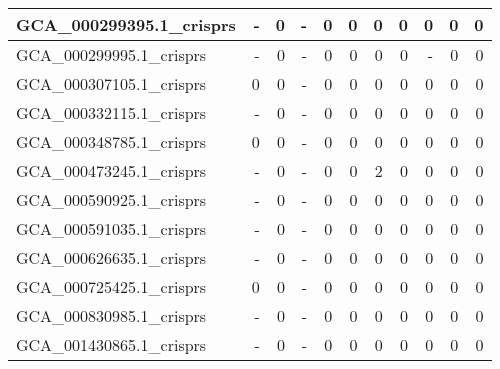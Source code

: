 \documentclass[12pt,a4paper]{article}
\begin{document}
\begin{table}[ht]
\begin{center}
\begin{tabular}{|l*{10}{|r}|}
GCA\_000299395.1\_crisprs & - & 0 & - & 0 & 0 & 0 & 0 & 0 & 0 & 0 \\ \hline
GCA\_000299995.1\_crisprs & - & 0 & - & 0 & 0 & 0 & 0 & - & 0 & 0 \\ \hline
GCA\_000307105.1\_crisprs & 0 & 0 & - & 0 & 0 & 0 & 0 & 0 & 0 & 0 \\ \hline
GCA\_000332115.1\_crisprs & - & 0 & - & 0 & 0 & 0 & 0 & 0 & 0 & 0 \\ \hline
GCA\_000348785.1\_crisprs & 0 & 0 & - & 0 & 0 & 0 & 0 & 0 & 0 & 0 \\ \hline
GCA\_000473245.1\_crisprs & - & 0 & - & 0 & 0 & 2 & 0 & 0 & 0 & 0 \\ \hline
GCA\_000590925.1\_crisprs & - & 0 & - & 0 & 0 & 0 & 0 & 0 & 0 & 0 \\ \hline
GCA\_000591035.1\_crisprs & - & 0 & - & 0 & 0 & 0 & 0 & 0 & 0 & 0 \\ \hline
GCA\_000626635.1\_crisprs & - & 0 & - & 0 & 0 & 0 & 0 & 0 & 0 & 0 \\ \hline
GCA\_000725425.1\_crisprs & 0 & 0 & - & 0 & 0 & 0 & 0 & 0 & 0 & 0 \\ \hline
GCA\_000830985.1\_crisprs & - & 0 & - & 0 & 0 & 0 & 0 & 0 & 0 & 0 \\ \hline
GCA\_001430865.1\_crisprs & - & 0 & - & 0 & 0 & 0 & 0 & 0 & 0 & 0 \\ \hline
\end{tabular}
\end{center}
\end{table}
\end{document}
